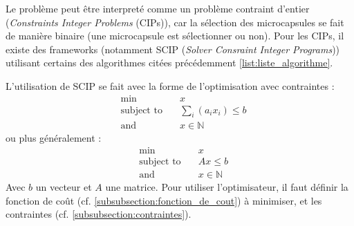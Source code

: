 Le problème peut être interpreté comme un problème contraint d'entier (\textit{Constraints Integer Problems} (CIPs)), car la sélection des \glspl{microcapsule} se fait de manière binaire (une \gls{microcapsule} est sélectionner ou non). Pour les CIPs, il existe des frameworks (notamment SCIP (\textit{Solver Consraint Integer Programs})) utilisant certains des algorithmes citées précédemment \autoref{list:liste_algorithme}.

L'utilisation de SCIP se fait avec la forme de l'optimisation avec contraintes :
\begin{align*}
    &\min\quad &x \\
    &\text{subject to}\quad &\sum_{i}\left( a_ix_i\right) \leq b \\
    &\text{and}\quad &x \in \mathbb{N}
\end{align*}
ou plus généralement : 
\begin{align*}
    &\min\quad &x \\
    &\text{subject to}\quad &Ax \leq b \\
    &\text{and}\quad &x \in \mathbb{N}
\end{align*}
Avec $b$ un vecteur et $A$ une matrice. Pour utiliser l'optimisateur, il faut définir la fonction de coût (cf. \autoref{subsubsection:fonction_de_cout}) à minimiser, et les contraintes (cf. \autoref{subsubsection:contraintes}).


